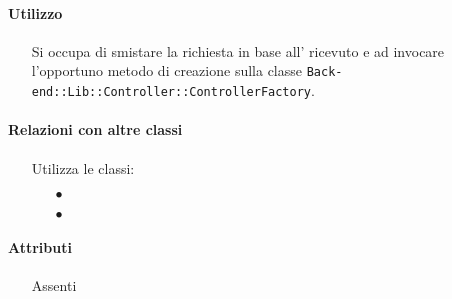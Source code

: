 \paragraph*{Utilizzo}
\begin{itemize}
\item[] Si occupa di smistare la richiesta in base all' ricevuto e ad invocare l'opportuno metodo di creazione sulla classe \texttt{Back-end::Lib::Controller::ControllerFactory}.
\end{itemize}

\paragraph*{Relazioni con altre classi}
\begin{itemize}


\item[] Utilizza le classi:
\begin{itemize}
\item[$\bullet$] 
\item[$\bullet$] 
\end{itemize}
\end{itemize}

\paragraph*{Attributi}
\begin{itemize}
\item[] Assenti
\end{itemize}

